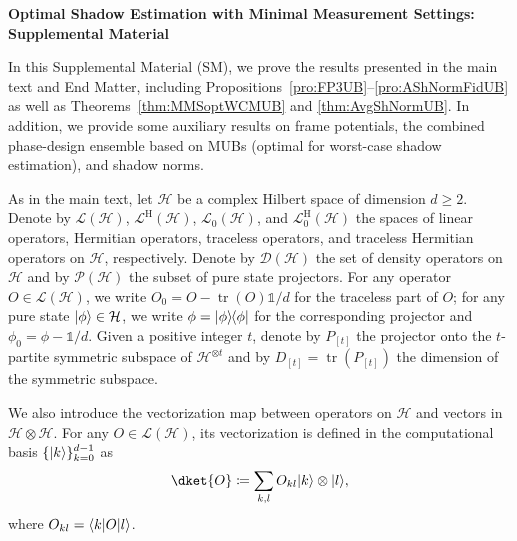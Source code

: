 \documentclass[aps,pra,twocolumn,nofootinbib,superscriptaddress,10pt]{revtex4-2}
\DeclarePairedDelimiter{\ket}{\lvert}{\rangle}
\DeclarePairedDelimiter{\bra}{\langle}{\rvert}
\newcommand{\ketbra}[2]{\ket{#1}\mkern-2mu\bra{#2}}
\newcommand{\proj}[1]{\ketbra{#1}{#1}}
\DeclareMathOperator{\tr}{tr}
\newcommand{\bbone}{\mathds{1}}
\newcommand{\caD}{\mathcal{D}}
\newcommand{\caH}{\mathcal{H}}
\newcommand{\caL}{\mathcal{L}}
\newcommand{\caP}{\mathcal{P}}
\newcommand{\rmH}{\mathrm{H}}
\newcommand{\thsref}[2]{Theorems~\ref{#1} and \ref{#2}}
\begin{document}
\renewcommand{\theequation}{S\arabic{equation}}
\renewcommand{\thefigure}{S\arabic{figure}}
\renewcommand{\thetable}{S\arabic{table}}
\renewcommand{\thetheorem}{S\arabic{theorem}}
\renewcommand{\thelemma}{S\arabic{lemma}}
\renewcommand{\theproposition}{S\arabic{proposition}}
\renewcommand{\thecorollary}{S\arabic{corollary}}
\renewcommand{\thesection}{S\arabic{section}}
\renewcommand{\theHfigure}{S\arabic{figure}}
\renewcommand{\theHtable}{S\arabic{table}}
\renewcommand{\theHequation}{S\arabic{equation}}
\renewcommand{\theHproposition}{S\arabic{proposition}}

\onecolumngrid	
\begin{center}
	\textbf{\large Optimal Shadow Estimation with Minimal Measurement Settings: Supplemental Material}
\end{center}

\tableofcontents

\bigskip

In this Supplemental Material (SM), we prove the results presented in the main text and End Matter, including Propositions~\ref{pro:FP3UB}--\ref{pro:AShNormFidUB} as well as  \thsref{thm:MMSoptWCMUB}{thm:AvgShNormUB}. In addition, we provide some auxiliary results on frame potentials, the combined phase-design ensemble based on MUBs (optimal for worst-case shadow estimation), and shadow norms.


As in the main text, let $\caH$ be a complex Hilbert space of dimension $d\ge2$. Denote by $\caL(\caH)$, $\caL^{\rmH}(\caH)$, $\caL_0(\caH)$, and $\caL^{\rmH}_0(\caH)$ the spaces of linear operators, Hermitian operators, traceless operators, and traceless Hermitian operators on $\caH$, respectively. Denote by $\caD(\caH)$ the set of density operators on $\caH$ and by $\caP(\caH)$ the subset of pure state projectors. For any operator $O \in \caL(\caH)$, we write $O_0=O-\tr(O)\bbone/d$ for the traceless part of $O$; for any pure state $\ket{\phi} \in \caH$, we write $\phi = \proj{\phi}$ for the corresponding projector and $\phi_0=\phi-\bbone/d$. Given a positive integer $t$, denote by $P_{[t]}$ the projector onto the $t$-partite symmetric subspace of $\caH^{\otimes t}$ and by  $D_{[t]}=\tr(P_{[t]})$ the dimension of the symmetric subspace.

We also introduce the vectorization map between operators on $\caH$ and vectors in $\caH \otimes \caH$. For any $O \in \caL(\caH)$, its vectorization is defined in the computational basis $\{\ket{k}\}_{k=0}^{d-1}$ as
\begin{align}
\dket{O} \coloneqq \sum_{k,l} O_{kl}\ket{k}\otimes \ket{l},
\end{align}
where $O_{kl}=\bra{k}O\ket{l}$.
\end{document}
